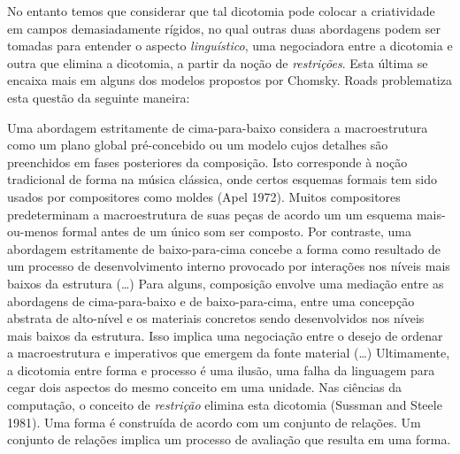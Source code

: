 No entanto temos que considerar que tal dicotomia pode colocar a criatividade em campos demasiadamente rígidos, no qual outras duas abordagens podem ser tomadas para entender o aspecto \textit{linguístico}, uma negociadora entre a dicotomia e outra que elimina a dicotomia, a partir da noção de \textit{restrições}. Esta última se encaixa mais em alguns dos modelos propostos por Chomsky. Roads problematiza esta questão da seguinte maneira:

\begin{citacao}
Uma abordagem estritamente de cima-para-baixo considera a macroestrutura como um plano global pré-concebido ou um modelo cujos detalhes são preenchidos em fases posteriores da composição. Isto corresponde à noção tradicional de forma na música clássica, onde certos esquemas formais tem sido usados por compositores como moldes (Apel 1972). Muitos compositores predeterminam a macroestrutura de suas peças de acordo um um esquema mais-ou-menos formal antes de um único som ser composto. Por contraste, uma abordagem estritamente de baixo-para-cima concebe a forma como resultado de um processo de desenvolvimento interno provocado por interações nos níveis mais baixos da estrutura (\ldots) Para alguns, composição envolve uma mediação entre as abordagens de cima-para-baixo e de baixo-para-cima, entre uma concepção abstrata de alto-nível e os materiais concretos sendo desenvolvidos nos níveis mais baixos da estrutura. Isso implica uma negociação entre o desejo de ordenar a macroestrutura e imperativos que emergem da fonte material (\ldots) Ultimamente, a dicotomia entre forma e processo é uma ilusão, uma falha da linguagem para cegar dois aspectos do mesmo conceito em uma unidade. Nas ciências da computação, o conceito de \textit{restrição} elimina esta dicotomia (Sussman and Steele 1981). Uma forma é construída de acordo com um conjunto de relações. Um conjunto de relações implica um processo de avaliação que resulta em uma forma.  \cite[p.~12-14]{roads_times_2001}

\end{citacao}
